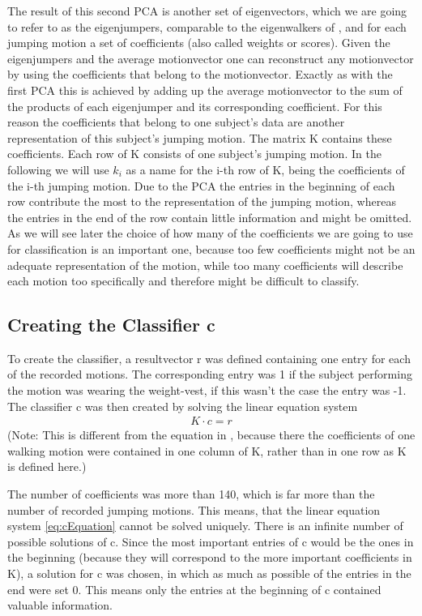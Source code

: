 \documentclass[a4paper]{article}
\begin{document}
The result of this second PCA is another set of eigenvectors, which we are going to refer to as the eigenjumpers, comparable to the eigenwalkers of \cite{origin}, and for each jumping motion a set of coefficients (also called weights or scores).
Given the eigenjumpers and the average motionvector one can reconstruct any motionvector by using the coefficients that belong to the motionvector. Exactly as with the first PCA this is achieved by adding up the average motionvector to the sum of the products of each eigenjumper and its corresponding coefficient.
For this reason the coefficients that belong to one subject's data are another representation of this subject's jumping motion.
The matrix K contains these coefficients. Each row of K consists of one subject's jumping motion. In the following we will use $k_{i}$ as a name for the i-th row of K, being the coefficients of the i-th jumping motion.
Due to the PCA the entries in the beginning of each row contribute the most to the representation of the jumping motion, whereas the entries in the end of the row contain little information and might be omitted.
As we will see later the choice of how many of the coefficients we are going to use for classification is an important one, because too few coefficients might not be an adequate representation of the motion, while too many coefficients will describe each motion too specifically and therefore might be difficult to classify.

\subsection{Creating the Classifier c}

To create the classifier, a resultvector r was defined containing one entry for each of the recorded motions. The corresponding entry was 1 if the subject performing the motion was wearing the weight-vest, if this wasn't the case the entry was -1. The classifier c was then created by solving the linear equation system
\begin{align}
	K \cdot c=r \label{eq:cEquation}
\end{align} 
(Note: This is different from the equation in \cite{origin}, because there the coefficients of one walking motion were contained in one column of K, rather than in one row as K is defined here.)

The number of coefficients was more than 140, which is far more than the number of recorded jumping motions. This means, that the linear equation system \ref{eq:cEquation} cannot be solved uniquely. There is an infinite number of possible solutions of c. Since the most important entries of c would be the ones in the beginning (because they will correspond to the more important coefficients in K), a solution for c was chosen, in which as much as possible of the entries in the end were set 0. This means only the entries at the beginning of c contained valuable information.
\end{document}
